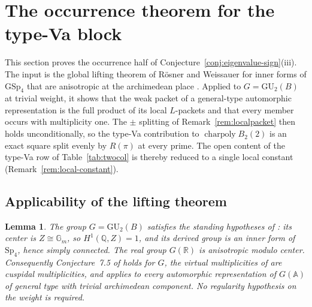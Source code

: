 \documentclass[10pt,a4paper]{amsart}
\newtheorem{lemma}[theorem]{Lemma}
\newcommand{\Q}{\mathbb{Q}}
\newcommand{\R}{\mathbb{R}}
\newcommand{\GU}{\mathrm{GU}}
\newcommand{\GSp}{\mathrm{GSp}}
\newcommand{\Sp}{\mathrm{Sp}}
\DeclareMathOperator{\charp}{charpoly}
\providecommand{\charp}{\operatorname{charpoly}}
\begin{document}
	\section{The occurrence theorem for the type-Va block}
	\label{sec:occurrence}
	
	This section proves the occurrence half of
	Conjecture~\ref{conj:eigenvalue-sign}\textup{(iii)}. The input is the
	global lifting theorem of R\"osner and Weissauer for inner forms of
	$\GSp_4$ that are anisotropic at the archimedean place
	\cite[Thm.~11.4]{RoesnerWeissauer2021}. Applied to $G=\GU_2(B)$ at
	trivial weight, it shows that the weak packet of a general-type
	automorphic representation is the full product of its local $L$-packets
	and that every member occurs with multiplicity one. The $\pm$ splitting
	of Remark~\ref{rem:localpacket} then holds unconditionally, so the
	type-Va contribution to $\charp B_2(2)$ is an exact square split evenly
	by $R(\pi)$ at every prime. The open content of the type-Va row of
	Table~\ref{tab:twocol} is thereby reduced to a single local constant
	(Remark~\ref{rem:local-constant}).
	
	\subsection{Applicability of the lifting theorem}
	\label{ss:rw-applicability}
	
	\begin{lemma}
		\label{lem:rw-applicable}
		The group $G=\GU_2(B)$ satisfies the standing hypotheses of
		\cite[\S1]{RoesnerWeissauer2021}: its center is
		$Z\cong\mathbb{G}_m$, so $H^1(\Q,Z)=1$, and its derived group is an
		inner form of $\Sp_4$, hence simply connected. The real group
		$G(\R)$ is anisotropic modulo center. Consequently Conjecture~7.5 of
		\cite{RoesnerWeissauer2021} holds for $G$, the virtual
		multiplicities of \cite[\S9]{RoesnerWeissauer2021} are cuspidal
		multiplicities, and \cite[Thm.~11.4]{RoesnerWeissauer2021} applies
		to every automorphic representation of $G(\mathbb{A})$ of general
		type with trivial archimedean component. No regularity hypothesis on
		the weight is required.
	\end{lemma}
	
\end{document}

